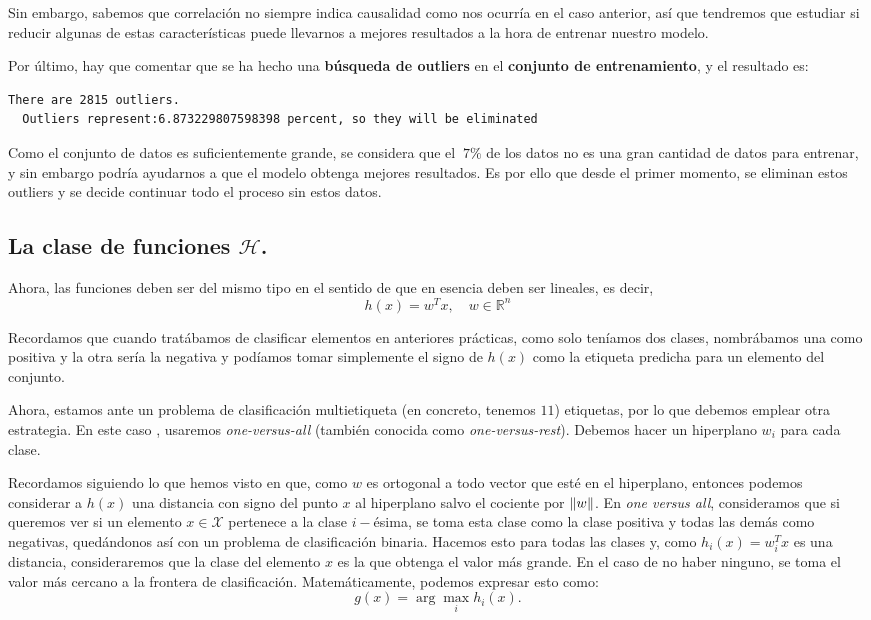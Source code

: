 \documentclass[a4paper, 20pt]{article}
\newcommand{\R}{\mathbb R}
\begin{document}
Sin embargo, sabemos que correlación no siempre indica causalidad como nos ocurría en el caso anterior, así que tendremos que estudiar si reducir algunas de estas características puede llevarnos a mejores resultados a la hora de entrenar nuestro modelo.

Por último, hay que comentar que se ha hecho una \textbf{búsqueda de outliers} en el \textbf{conjunto de entrenamiento}, y el resultado es:
\begin{lstlisting}[language=bash]
  There are 2815 outliers.
  Outliers represent:6.873229807598398 percent, so they will be eliminated
\end{lstlisting}

Como el conjunto de datos es suficientemente grande, se considera que el $~7\%$ de los datos no es una gran cantidad de datos para entrenar, y sin embargo podría ayudarnos a que el modelo obtenga mejores resultados. Es por ello que desde el primer momento, se eliminan estos outliers y se decide continuar todo el proceso sin estos datos.

\subsection{La clase de funciones $\mathcal H$.}


Ahora, las funciones deben ser del mismo tipo en el sentido de que en esencia deben ser lineales, es decir,
$$
h(x) = w^T x, \quad w \in \R^n
$$

Recordamos que cuando tratábamos de clasificar elementos en anteriores prácticas, como solo teníamos dos clases, nombrábamos una como positiva y la otra sería la negativa y podíamos tomar simplemente el signo de $h(x)$ como la etiqueta predicha para un elemento del conjunto. 

Ahora, estamos ante un problema de clasificación multietiqueta (en concreto, tenemos $11$) etiquetas, por lo que debemos emplear otra estrategia. En este caso , usaremos \emph{one-versus-all} (también conocida como \emph{one-versus-rest}). Debemos hacer un hiperplano $w_i$ para cada clase. 

Recordamos siguiendo lo que hemos visto en \cite{learn_from_data} que, como $w$ es ortogonal a todo vector que esté en el hiperplano, entonces podemos considerar a $h(x)$ una distancia con signo del punto $x$ al hiperplano salvo el cociente por $\norm{w}$. En \emph{one versus all}, consideramos que si queremos ver si un elemento $x \in \mathcal X$ pertenece a la clase $i-$ésima, se toma esta clase como la clase positiva y todas las demás como negativas, quedándonos así con un problema de clasificación binaria. Hacemos esto para todas las clases y, como $h_i(x) = w_i^T x$ es una distancia, consideraremos que la clase del elemento $x$ es la que obtenga el valor más grande. En el caso de no haber ninguno, se toma el valor más cercano a la frontera de clasificación. Matemáticamente, podemos expresar esto como:
$$
g(x) = \arg \max_i h_i(x).
$$
\end{document}
